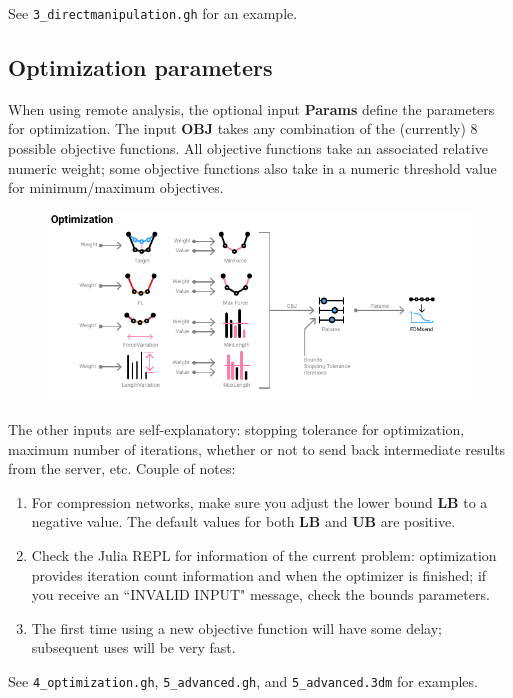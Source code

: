 \vspace{2em}

See \texttt{3\_directmanipulation.gh} for an example.

\newpage
\subsection{Optimization parameters}
When using remote analysis, the optional input \textbf{Params} define the parameters for optimization. The input \textbf{OBJ} takes any combination of the (currently) 8 possible objective functions. All objective functions take an associated relative numeric weight; some objective functions also take in a numeric threshold value for minimum/maximum objectives.

\begin{figure}[h]
    \centering
    \includegraphics*[width=\textwidth]{Figures/optim}
\end{figure}

The other inputs are self-explanatory: stopping tolerance for optimization, maximum number of iterations, whether or not to send back intermediate results from the server, etc. Couple of notes:
\begin{enumerate}
    \item For compression networks, make sure you adjust the lower bound \textbf{LB} to a negative value. The default values for both \textbf{LB} and \textbf{UB} are positive.
    \item Check the Julia REPL for information of the current problem: optimization provides iteration count information and when the optimizer is finished; if you receive an ``INVALID INPUT" message, check the bounds parameters.
    \item The first time using a new objective function will have some delay; subsequent uses will be very fast.
\end{enumerate}

\vspace{2em}

See \texttt{4\_optimization.gh}, \texttt{5\_advanced.gh}, and \texttt{5\_advanced.3dm} for examples.